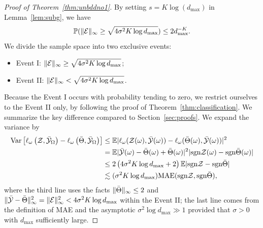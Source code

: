 \documentclass[11pt]{article}
\theoremstyle{plain}
\theoremstyle{definition}
\def\sign{\textup{sgn}}
\begin{document}
\begin{proof}[Proof of Theorem~\ref{thm:unbddno1}]
By setting $s=K\log(d_{\max})$ in Lemma~\ref{lem:subg}, we have
\[
\mathbb{P}(\lVert\mathcal{E}\rVert_\infty\geq \sqrt{4\sigma^2K\log d_{\max}} )\leq 2d_{\max}^{-K}.
\]
We divide the sample space into two exclusive events:
\begin{itemize}
\item Event I: $\lVert\mathcal{E}\rVert_\infty\geq \sqrt{4\sigma^2K\log d_{\max}}$;
\item Event II: $\lVert\mathcal{E}\rVert_\infty< \sqrt{4\sigma^2K\log d_{\max}}$.
\end{itemize}
Because the Event I occurs with probability tending to zero, we restrict ourselves to the Event II only, by following the proof of Theorem~\ref{thm:classification}. We summarize the key difference compared to Section~\ref{sec:proofs}. 
We expand the variance by 
\begin{align}
    \label{eq:variance2}
    \text{Var}\left[\ell_\omega\left(\tZ,\bar\tY_\Omega\right)-\ell_\omega\left(\bar\Theta,\bar\tY_\Omega\right)\right]&\leq \mathbb{E}|\ell_\omega(\tZ(\omega),\bar\tY(\omega))-\ell_\omega(\bar\Theta(\omega),\bar\tY(\omega))|^2\notag \\
    &= \mathbb{E}|\bar \tY(\omega)-\bar \Theta(\omega)+\bar\Theta(\omega)|^2|\text{sgn}\tZ(\omega)-\text{sgn}\bar\Theta(\omega)| \notag \\
    &\leq 2\left(4 \sigma^2K\log d_{\max}+2\right) \mathbb{E}|\text{sgn}\tZ-\text{sgn}\bar\Theta| \notag \\
    & \lesssim (\sigma^2K \log d_{\max}) \text{MAE}(\sign \tZ, \sign \bar \Theta),
    \end{align}
where the third line uses the facts $\lVert\bar \Theta\rVert_\infty\leq 2$ and $\lVert\bar {\mathcal{Y}}-\bar \Theta\rVert_\infty^2=\lVert\mathcal{E}\rVert_\infty^2<4 \sigma^2K\log d_{\max}$ within the Event II; the last line comes from the definition of MAE and the asymptotic $\sigma^2\log d_{\max}\gg 1$ provided that $\sigma>0$ with $d_{\max}$ sufficiently large. 


\end{proof}
\end{document}
